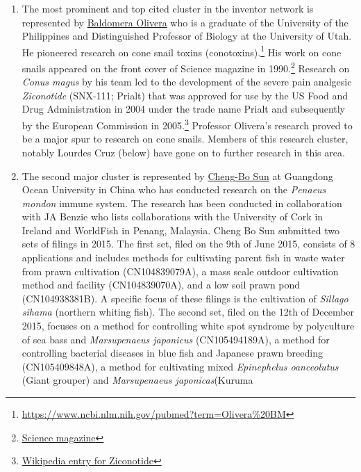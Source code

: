 \documentclass[]{book}
\theoremstyle{definition}
\theoremstyle{definition}
\theoremstyle{definition}
\theoremstyle{remark}
\begin{document}
\begin{enumerate}
\def\labelenumi{\arabic{enumi}.}
\item
  The most prominent and top cited cluster in the inventor network is
  represented by
  \href{https://en.wikipedia.org/wiki/Baldomero_Olivera}{Baldomera
  Olivera} who is a graduate of the University of the Philippines and
  Distinguished Professor of Biology at the University of Utah. He
  pioneered research on cone snail toxins (conotoxins).\footnote{\url{https://www.ncbi.nlm.nih.gov/pubmed?term=Olivera\%20BM}}
  His work on cone snails appeared on the front cover of Science
  magazine in 1990.\footnote{\href{http://science.sciencemag.org/content/249/4966}{Science
    magazine}} Research on \emph{Conus magus} by his team led to the
  development of the severe pain analgesic \emph{Ziconotide} (SNX-111;
  Prialt) that was approved for use by the US Food and Drug
  Administration in 2004 under the trade name Prialt and subsequently by
  the European Commission in 2005.\footnote{\href{https://en.wikipedia.org/wiki/Ziconotide}{Wikipedia
    entry for Ziconotide}} Professor Olivera's research proved to be a
  major spur to research on cone snails. Members of this research
  cluster, notably Lourdes Cruz (below) have gone on to further research
  in this area.
\item
  The second major cluster is represented by
  \href{https://www.researchgate.net/scientific-contributions/2040070693_Cheng-Bo_Sun}{Cheng-Bo
  Sun} at Guangdong Ocean University in China who has conducted research
  on the \emph{Penaeus mondon} immune system. The research has been
  conducted in collaboration with JA Benzie who lists collaborations
  with the University of Cork in Ireland and WorldFish in Penang,
  Malaysia. Cheng Bo Sun submitted two sets of filings in 2015. The
  first set, filed on the 9th of June 2015, consists of 8 applications
  and includes methods for cultivating parent fish in waste water from
  prawn cultivation (CN104839079A), a mass scale outdoor cultivation
  method and facility (CN104839070A), and a low soil prawn pond
  (CN104938381B). A specific focus of these filings is the cultivation
  of \emph{Sillago sihama} (northern whiting fish). The second set,
  filed on the 12th of December 2015, focuses on a method for
  controlling white spot syndrome by polyculture of sea bass and
  \emph{Marsupenaeus japonicus} (CN105494189A), a method for controlling
  bacterial diseases in blue fish and Japanese prawn breeding
  (CN105409848A), a method for cultivating mixed \emph{Epinephelus
  oanceolutus} (Giant grouper) and \emph{Marsupenaeus japonicas}(Kuruma

\end{enumerate}
\end{document}
